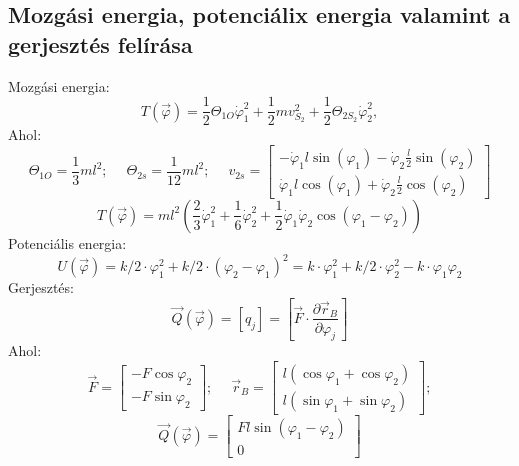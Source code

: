 \documentclass[12pt,twoside]{article}
\begin{document}
\subsection{Mozgási energia, potenciálix energia valamint a gerjesztés felírása}%
Mozgási energia:\newline
\begin{equation} \label{eq:Newton}
T(\vec\varphi)=\frac{1}{2 }\Theta_{1O}\dot\varphi_1^2+\frac{1}{2 }mv_{S_2}^2+\frac{1}{2 }\Theta_{2S_2}\dot\varphi_2^2,
\end{equation}
Ahol:
\begin{equation} \label{eq:Newton}
\Theta_{1O}=\frac{1}{3}ml^2; \; \quad \Theta_{2s}=\frac{1}{12}ml^2; \; \quad v_{2s}=\begin{bmatrix}
-\dot\varphi_1 l \sin (\varphi_1)-\dot\varphi_2 \frac{l}{2} \sin (\varphi_2)\\
\dot\varphi_1 l \cos (\varphi_1)+\dot\varphi_2 \frac{l}{2} \cos (\varphi_2)
\end{bmatrix}
\end{equation}
\begin{equation} \label{eq:Newton}
T(\vec\varphi)=ml^2\left(\frac{2}{3}\dot\varphi_1^2+\frac{1}{6}\dot\varphi_2^2+
\frac{1}{2}\dot\varphi_1\dot\varphi_2 \cos(\varphi_1-\varphi_2)\right)
\end{equation}
Potenciális energia:
\begin{equation} \label{eq:Newton}
U(\vec\varphi)=k/2 \cdot \varphi_1 ^2 + k/2 \cdot (\varphi_2-\varphi_1)^2=
k \cdot \varphi_1 ^2 + k/2 \cdot\varphi_2^2 -k \cdot \varphi_1\varphi_2
\end{equation}
Gerjesztés:
\begin{equation} \label{eq:Newton}
\vec Q(\vec\varphi)=[q_j]=\left[\vec F \cdot \frac{\partial \vec r_B}{\partial \varphi_j}\right]
\end{equation}
Ahol:
\begin{equation} \label{eq:Newton}
\vec F =
\begin{bmatrix}
-F \cos\varphi_2 \\
-F \sin\varphi_2
\end{bmatrix};\; \quad
\vec r_B=
\begin{bmatrix}
l(\cos\varphi_1+\cos\varphi_2)\\
l(\sin\varphi_1+\sin\varphi_2)
\end{bmatrix};
\end{equation}
\begin{equation} \label{eq:Newton}
\vec Q(\vec\varphi)=
\begin{bmatrix}
Fl\sin(\varphi_1-\varphi_2) \\
0
\end{bmatrix}
\end{equation}
\end{document}
